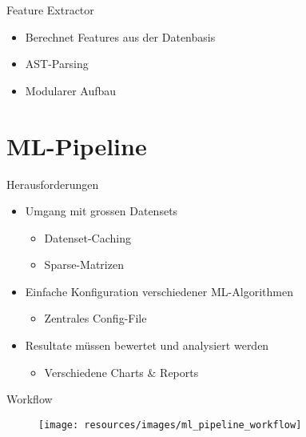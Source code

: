 \documentclass[12pt]{beamer}
\begin{document}
\begin{frame}[fragile]{Feature Extractor}
	\begin{itemize}
		\item Berechnet Features aus der Datenbasis
		\item AST-Parsing
		\item Modularer Aufbau
	\end{itemize}
\end{frame}


\section{ML-Pipeline} %

\begin{frame}[fragile]{Herausforderungen}
	\begin{itemize}
		\item Umgang mit \alert{grossen Datensets}
		\begin{itemize}
			\item Datenset-Caching
			\item Sparse-Matrizen
		\end{itemize}
		\item Einfache Konfiguration verschiedener \alert{ML-Algorithmen}
		\begin{itemize}
			\item Zentrales Config-File
		\end{itemize}
		\item Resultate müssen \alert{bewertet} und \alert{analysiert} werden
		\begin{itemize}
			\item Verschiedene Charts \& Reports
		\end{itemize}
	\end{itemize}
\end{frame}


\begin{frame}[fragile]{Workflow}
	\begin{figure}[h!]
		\centering
		\texttt{[image: resources/images/ml\_pipeline\_workflow]}
		\label{fig:ml_comparisation_runtime}
	\end{figure}
\end{frame}
\end{document}
